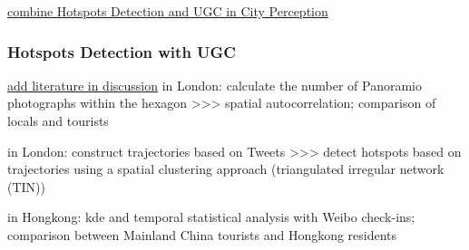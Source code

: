 \documentclass{article}
\theoremstyle{remark}
\begin{document}
\underline{combine Hotspots Detection and UGC in City Perception}

\subsubsection{Hotspots Detection with UGC}

\underline{add literature in discussion}
\cite{garcia-palomares_identification_2015} in London: calculate the number of Panoramio photographs within the hexagon >>> spatial autocorrelation; comparison of locals and tourists

\cite{ma_exploring_2020} in London: construct trajectories based on Tweets >>> detect hotspots based on trajectories using a spatial clustering approach (triangulated irregular network (TIN))

\cite{su_analysing_2020} in Hongkong: kde and temporal statistical analysis with Weibo check-ins; comparison between Mainland China tourists and Hongkong residents
\end{document}
